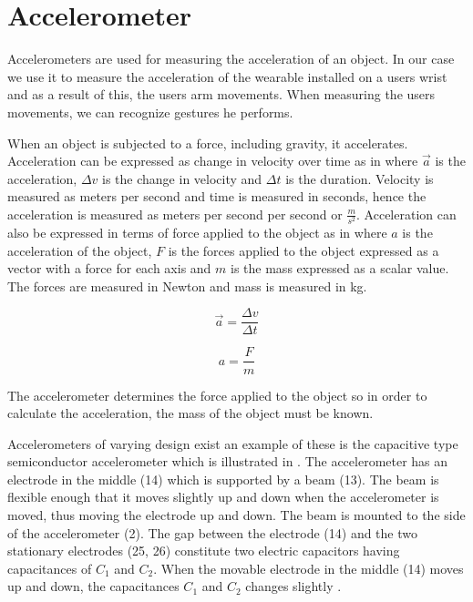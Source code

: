 \section{Accelerometer}

Accelerometers are used for measuring the acceleration of an object. In our case we use it to measure the acceleration of the wearable installed on a users wrist and as a result of this, the users arm movements. When measuring the users movements, we can recognize gestures he performs.

When an object is subjected to a force, including gravity, it accelerates. Acceleration can be expressed as change in velocity over time as in  where $\vec{a}$ is the acceleration, $\Delta v$ is the change in velocity and $\Delta t$ is the duration.
Velocity is measured as meters per second and time is measured in seconds, hence the acceleration is measured as meters per second per second or $\frac{m}{s^2}$.
Acceleration can also be expressed in terms of force applied to the object as in  where $a$ is the acceleration of the object, $F$ is the forces applied to the object expressed as a vector with a force for each axis and $m$ is the mass expressed as a scalar value.
The forces are measured in Newton and mass is measured in kg.

\begin{centering}
\begin{minipage}{.5\linewidth}
    \begin{equation}
    \vec{a} = \frac{\Delta v}{\Delta t}
    \label{eq:acceleration-delta-velocity}
    \end{equation}
\end{minipage}
\begin{minipage}{.5\linewidth}
    \begin{equation}
    a = \frac{F}{m}
    \label{eq:acceleration-force}
    \end{equation}
\end{minipage}
\end{centering}

The accelerometer determines the force applied to the object \cite[pp. 392-393]{Fraden:2112745} so in order to calculate the acceleration, the mass of the object must be known.

Accelerometers of varying design exist \cite[pp. 392-411]{Fraden:2112745} an example of these is the capacitive type semiconductor accelerometer which is illustrated in . The accelerometer has an electrode in the middle (14) which is supported by a beam (13). The beam is flexible enough that it moves slightly up and down when the accelerometer is moved, thus moving the electrode up and down. The beam is mounted to the side of the accelerometer (2). The gap between the electrode (14) and the two stationary electrodes (25, 26) constitute two electric capacitors having capacitances of $C_1$ and $C_2$.
When the movable electrode in the middle (14) moves up and down, the capacitances $C_1$ and $C_2$ changes slightly \cite{kloeck1993capacitive}.


